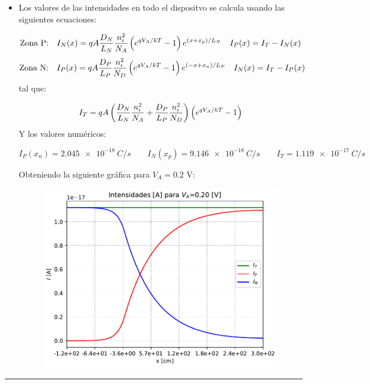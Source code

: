 \begin{itemize}
    \item Los valores de las intensidades en todo el dispositvo se calcula usando las siguientes ecuaciones: 
    
    \begin{equation*}
        \text{Zona P:} \quad 
        I_N(x) = qA\frac{D_N}{L_N} \frac{n_i^2}{N_A}  \left( e^{qV_A/kT}-1 \right) e^{(x+x_p)/L_N} \quad I_P(x) = I_T - I_N (x)
    \end{equation*}
    \begin{equation*}
        \text{Zona N:} \quad 
        I_P(x) = qA\frac{D_P}{L_P} \frac{n_i^2}{N_D}  \left( e^{qV_A/kT}-1 \right) e^{(-x+x_n)/L_P} \quad I_N(x) = I_T - I_P (x)
    \end{equation*}
    tal que:

    \begin{equation*}
        I_T = qA\left( \frac{D_N}{L_N} \frac{n_i^2}{N_A}+\frac{D_P}{L_P} \frac{n_i^2}{N_D} \right)  \left( e^{q V_A/kT}-1 \right)
    \end{equation*}
    Y los valores numéricos:

    \begin{equation}
        I_P (x_n) = \SI{2.045e-18}{C/s} \qquad 
        I_N (x_p) = \SI{9.146e-18}{C/s} \qquad
        I_T = \SI{1.119e-17}{C/s}
    \end{equation}

    Obteniendo la siguiente gráfica para $V_A=0.2$ V: 


    \begin{figure}[h!] \centering
        \includegraphics[width=0.6\linewidth]{Cuerpo/Ch_03/03_06_02.pdf}
    \end{figure}
    
\end{itemize}

\rule{\textwidth}{0.1pt} \\[2pt]




